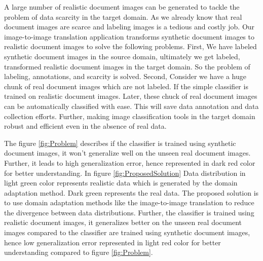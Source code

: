 A large number of realistic document images can be generated to tackle the problem of data scarcity in the target domain. As we already know that real document images are scarce and labeling images is a tedious and costly job. Our image-to-image translation application transforms synthetic document images to realistic document images to solve the following problems. First, We have labeled synthetic document images in the source domain, ultimately we get labeled, transformed realistic document images in the target domain. So the problem of labeling, annotations, and scarcity is solved. Second, Consider we have a huge chunk of real document images which are not labeled. If the simple classifier is trained on realistic document images. Later, these chuck of real document images can be automatically classified with ease. This will save data annotation and data collection efforts. Further, making image classification tools in the target domain robust and efficient even in the absence of real data. 

The figure \ref{fig:Problem} describes if the classifier is trained using synthetic document images, it won't generalize well on the unseen real document images. Further, it leads to high generalization error, hence represented in dark red color for better understanding. In figure \ref{fig:ProposedSolution} Data distribution in light green color represents realistic data which is generated by the domain adaptation method. Dark green represents the real data. The proposed solution is to use domain adaptation methods like the image-to-image translation to reduce the divergence between data distributions. Further, the classifier is trained using realistic document images, it generalizes better on the unseen real document images compared to the classifier are trained using synthetic document images, hence low generalization error represented in light red color for better understanding compared to figure \ref{fig:Problem}.


